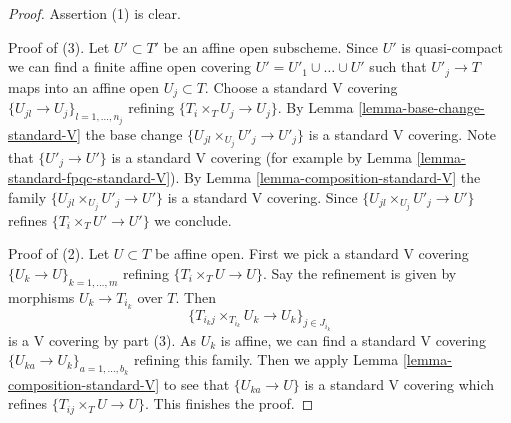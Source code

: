 \documentclass[10pt,a4paper]{amsart}
\theoremstyle{plain}
\theoremstyle{definition}
\theoremstyle{remark}
\numberwithin{equation}{subsection}
\begin{document}
\begin{proof}
Assertion (1) is clear.

\medskip\noindent
Proof of (3).
Let $U' \subset T'$ be an affine open subscheme.
Since $U'$ is quasi-compact we can find a finite affine open
covering $U' = U'_1 \cup \ldots \cup U'$ such that
$U'_j \to T$ maps into an affine open $U_j \subset T$.
Choose a standard V covering $\{U_{jl} \to U_j\}_{l = 1, \ldots, n_j}$
refining $\{T_i \times_T U_j \to U_j\}$.
By Lemma \ref{lemma-base-change-standard-V}
the base change $\{U_{jl} \times_{U_j} U'_j \to U'_j\}$
is a standard V covering. Note that $\{U'_j \to U'\}$
is a standard V covering
(for example by Lemma \ref{lemma-standard-fpqc-standard-V}).
By Lemma \ref{lemma-composition-standard-V} 
the family $\{U_{jl} \times_{U_j} U'_j \to U'\}$
is a standard V covering. Since
$\{U_{jl} \times_{U_j} U'_j \to U'\}$ refines $\{T_i \times_T U' \to U'\}$
we conclude.

\medskip\noindent
Proof of (2).
Let $U \subset T$ be affine open. First we pick a standard V covering
$\{U_k \to U\}_{k = 1, \ldots, m}$ refining
$\{T_i \times_T U \to U\}$.
Say the refinement is given by morphisms $U_k \to T_{i_k}$ over $T$.
Then
$$
\{T_{i_kj} \times_{T_{i_k}} U_k \to U_k\}_{j \in J_{i_k}}
$$
is a V covering by part (3). As $U_k$ is affine,
we can find a standard V covering
$\{U_{ka} \to U_k\}_{a = 1, \ldots, b_k}$ refining this family.
Then we apply Lemma \ref{lemma-composition-standard-V}
to see that $\{U_{ka} \to U\}$ is a standard V covering which
refines $\{T_{ij} \times_T U \to U\}$. This finishes the proof.
\end{proof}
\end{document}
